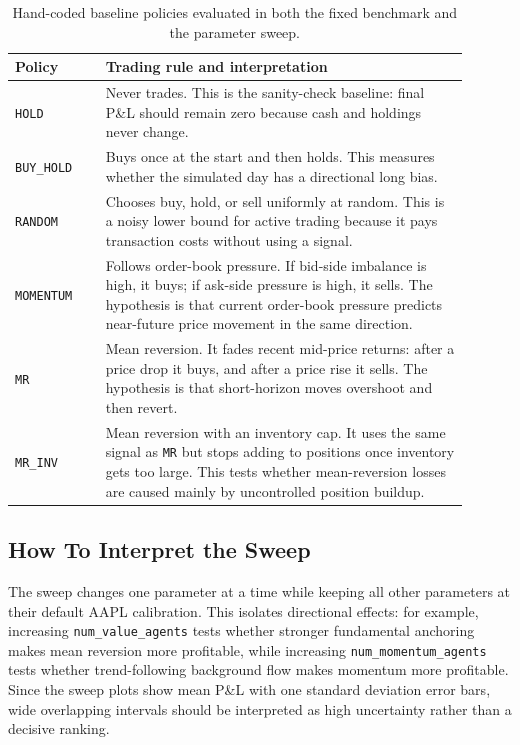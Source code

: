 \documentclass[11pt]{article}
\begin{document}
\begin{table}[H]
\centering
\small
\begin{tabular}{p{0.18\linewidth}p{0.72\linewidth}}
\toprule
Policy & Trading rule and interpretation \\
\midrule
\texttt{HOLD} &
Never trades. This is the sanity-check baseline: final P\&L should remain zero
because cash and holdings never change. \\
\texttt{BUY\_HOLD} &
Buys once at the start and then holds. This measures whether the simulated day
has a directional long bias. \\
\texttt{RANDOM} &
Chooses buy, hold, or sell uniformly at random. This is a noisy lower bound for
active trading because it pays transaction costs without using a signal. \\
\texttt{MOMENTUM} &
Follows order-book pressure. If bid-side imbalance is high, it buys; if ask-side
pressure is high, it sells. The hypothesis is that current order-book pressure
predicts near-future price movement in the same direction. \\
\texttt{MR} &
Mean reversion. It fades recent mid-price returns: after a price drop it buys,
and after a price rise it sells. The hypothesis is that short-horizon moves
overshoot and then revert. \\
\texttt{MR\_INV} &
Mean reversion with an inventory cap. It uses the same signal as \texttt{MR} but
stops adding to positions once inventory gets too large. This tests whether
mean-reversion losses are caused mainly by uncontrolled position buildup. \\
\bottomrule
\end{tabular}
\caption{Hand-coded baseline policies evaluated in both the fixed benchmark and
the parameter sweep.}
\label{tab:baseline-policy-context}
\end{table}

\subsection{How To Interpret the Sweep}

The sweep changes one parameter at a time while keeping all other parameters at
their default AAPL calibration. This isolates directional effects: for example,
increasing \texttt{num\_value\_agents} tests whether stronger fundamental
anchoring makes mean reversion more profitable, while increasing
\texttt{num\_momentum\_agents} tests whether trend-following background flow
makes momentum more profitable. Since the sweep plots show mean P\&L with one
standard deviation error bars, wide overlapping intervals should be interpreted
as high uncertainty rather than a decisive ranking.
\end{document}
